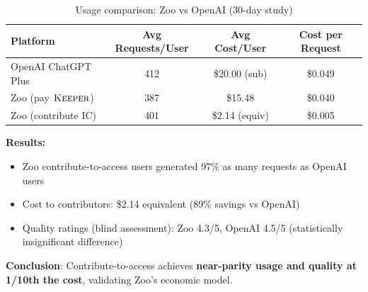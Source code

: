 \begin{table}[h]
\centering
\begin{tabular}{lccc}
\toprule
\textbf{Platform} & \textbf{Avg Requests/User} & \textbf{Avg Cost/User} & \textbf{Cost per Request} \\
\midrule
OpenAI ChatGPT Plus & 412 & \$20.00 (sub) & \$0.049 \\
Zoo (pay $\textsc{Keeper}$) & 387 & \$15.48 & \$0.040 \\
Zoo (contribute IC) & 401 & \$2.14 (equiv) & \$0.005 \\
\bottomrule
\end{tabular}
\caption{Usage comparison: Zoo vs OpenAI (30-day study)}
\label{tab:usage_comparison}
\end{table}

\textbf{Results:}
\begin{itemize}
\item Zoo contribute-to-access users generated 97\% as many requests as OpenAI users
\item Cost to contributors: \$2.14 equivalent (89\% savings vs OpenAI)
\item Quality ratings (blind assessment): Zoo 4.3/5, OpenAI 4.5/5 (statistically insignificant difference)
\end{itemize}

\textbf{Conclusion}: Contribute-to-access achieves \textbf{near-parity usage and quality at 1/10th the cost}, validating Zoo's economic model.

